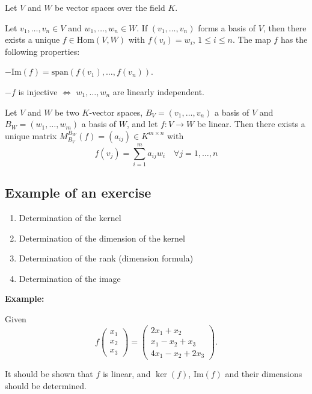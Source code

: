 Let \(V\) and \(W\) be vector spaces over the field \(K\).
\vspace{\baselineskip}

Let \(v_1, \dots, v_n \in V\) and \(w_1, \dots, w_n \in W\). If \((v_1, \dots, v_n)\) 
forms a basis of \(V\), then there exists a unique \(f \in \text{Hom}(V, W)\) with 
\(f(v_i) = w_i\), \(1 \leq i \leq n\). The map \(f\) has the following properties:

\(- \text{Im}(f) = \text{span}(f(v_1), \dots, f(v_n))\).

\(- f\) is injective \(\Leftrightarrow\) \(w_1, \dots, w_n\) are linearly independent.

Let \(V\) and \(W\) be two \(K\)-vector spaces, \(B_V = (v_1, \dots, v_n)\) a basis of \(V\) and \(B_W = (w_1, \dots, w_m)\) a basis of \(W\), and let \(f : V \rightarrow W\) be linear. Then there exists a unique matrix \(M_{B_V}^{B_W}(f) = (a_{ij}) \in K^{m \times n}\) with
\[
f(v_j) = \sum_{i=1}^{m} a_{ij}w_i \quad \forall j = 1, \dots, n
\]

\subsection{Example of an exercise}

\begin{enumerate}
    \item Determination of the kernel
    \item Determination of the dimension of the kernel
    \item Determination of the rank (dimension formula)
    \item Determination of the image
\end{enumerate}


\textbf{Example:}
\vspace{\baselineskip}
 

Given
\[
f\begin{pmatrix}
x_1 \\
x_2 \\
x_3
\end{pmatrix} =
\begin{pmatrix}
2x_1 + x_2 \\
x_1 - x_2 + x_3 \\
4x_1 - x_2 + 2x_3
\end{pmatrix} .
\]

It should be shown that \(f\) is linear, and \(\ker(f)\), \(\text{Im}(f)\) and their dimensions should be determined.

